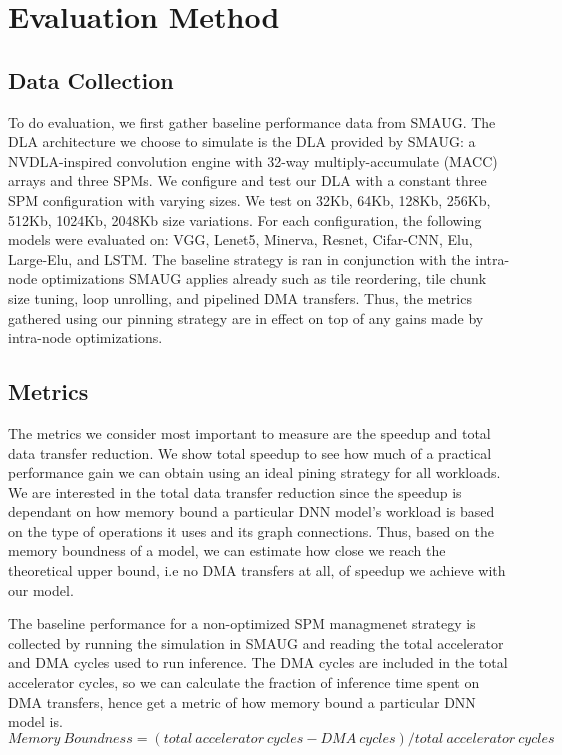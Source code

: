 \chapter{Evaluation Method} %

\label{Chapter6} %

\section{Data Collection}
To do evaluation, we first gather baseline performance data from SMAUG. The DLA architecture we
choose to simulate is the DLA provided by SMAUG: a NVDLA-inspired convolution engine with
32-way multiply-accumulate (MACC) arrays and three SPMs. We configure and test our DLA with
a constant three SPM configuration with varying sizes. We test on 32Kb, 64Kb, 128Kb, 256Kb,
512Kb, 1024Kb, 2048Kb size variations. For each configuration, the following models were
evaluated on: VGG, Lenet5, Minerva, Resnet, Cifar-CNN, Elu, Large-Elu, and LSTM. The baseline
strategy is ran in conjunction with the intra-node optimizations SMAUG applies already such
as tile reordering, tile chunk size tuning, loop unrolling, and pipelined DMA transfers. Thus,
the metrics gathered using our pinning strategy are in effect on top of any gains made by
intra-node optimizations.

\section{Metrics}
The metrics we consider most important to measure are the speedup and total
data transfer reduction. We show total speedup to see how much of a practical
performance gain we can obtain using an ideal pining strategy for all workloads.
We are interested in the total data transfer reduction since the speedup is 
dependant on how memory bound a particular DNN model's workload is based on the type
of operations it uses and its graph connections. Thus, based on the memory boundness
of a model, we can estimate how close we reach the theoretical upper bound, i.e
no DMA transfers at all, of speedup we achieve with our model.

The baseline performance for a non-optimized SPM managmenet strategy is
collected by running the simulation in SMAUG and reading the total accelerator
and DMA cycles used to run inference. The DMA cycles are included in the total
accelerator cycles, so we can calculate the fraction of inference time spent on
DMA transfers, hence get a metric of how memory bound a particular DNN model
is.
\[
    Memory\ Boundness = (total\ accelerator\ cycles - DMA\ cycles) / total\ accelerator\ cycles
\]

